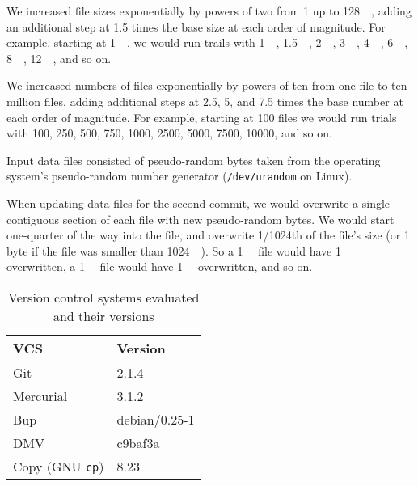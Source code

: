 We increased file sizes exponentially by powers of two from \SI{1}{\byte} up to
\SI{128}{\gibi\byte}, adding an additional step at \num{1.5} times the base size
at each order of magnitude. For example, starting at \SI{1}{\mebi\byte}, we
would run trails with \SI{1}{\mebi\byte}, \SI{1.5}{\mebi\byte},
\SI{2}{\mebi\byte}, \SI{3}{\mebi\byte}, \SI{4}{\mebi\byte}, \SI{6}{\mebi\byte},
\SI{8}{\mebi\byte}, \SI{12}{\mebi\byte}, and so on.

We increased numbers of files exponentially by powers of ten from one file to
ten million files, adding additional steps at \num{2.5}, \num{5}, and \num{7.5}
times the base number at each order of magnitude. For example, starting at
\num{100} files we would run trials with \num{100}, \num{250}, \num{500},
\num{750}, \num{1000}, \num{2500}, \num{5000}, \num{7500}, \num{10000}, and so
on.

Input data files consisted of pseudo-random bytes taken from the operating
system's pseudo-random number generator (\lstinline{/dev/urandom} on Linux).

When updating data files for the second \gls{commit}, we would overwrite a
single contiguous section of each file with new pseudo-random bytes. We would
start one-quarter of the way into the file, and overwrite \num{1/1024}th of the
file's size (or 1 byte if the file was smaller than \SI{1024}{\kibi\byte}). So a
\SI{1}{\mebi\byte} file would have \SI{1}{\kibi\byte} overwritten, a
\SI{1}{\gibi\byte} file would have \SI{1}{\mebi\byte} overwritten, and so on.

%


\begin{table}[p]
    \caption{Version control systems evaluated and their versions}
    \label{vcs-versions}
    \centering
    \begin{tabular}{ l l }
        VCS & Version \\
        \midrule
        Git & 2.1.4 \\
        Mercurial & 3.1.2 \\
        Bup & debian/0.25-1 \\
        DMV & c9baf3a \\
        Copy (GNU \lstinline{cp}) & 8.23 \\
    \end{tabular}
\end{table}

